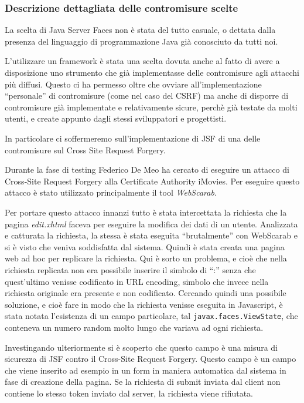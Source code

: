 \documentclass{article}
\begin{document}
\subsubsection{Descrizione dettagliata delle contromisure scelte}
La scelta di Java Server Faces non è stata del tutto casuale, o dettata dalla presenza del linguaggio di programmazione Java già conosciuto da tutti noi.

L'utilizzare un framework è stata una scelta dovuta anche al fatto di avere a disposizione uno strumento che già implementasse delle contromisure agli attacchi più diffusi. Questo ci ha permesso oltre che ovviare all'implementazione ``personale'' di contromisure (come nel caso del CSRF) ma anche di disporre di contromisure già implementate e relativamente sicure, perchè già testate da molti utenti, e create appunto dagli stessi sviluppatori e progettisti.

In particolare ci soffermeremo sull'implementazione di JSF di una delle contromisure sul Cross Site Request Forgery. 

Durante la fase di testing Federico De Meo ha cercato di eseguire un attacco di Cross-Site Request Forgery alla Certificate Authority iMovies. Per eseguire questo attacco è stato utilizzato principalmente il tool \emph{WebScarab}. 

Per portare questo attacco innanzi tutto è stata intercettata la richiesta che la pagina \emph{edit.xhtml} faceva per eseguire la modifica dei dati di un utente. Analizzata e catturata la richiesta, la stessa è stata eseguita ``brutalmente'' con WebScarab e si è visto che veniva soddisfatta dal sistema.
Quindi è stata creata una pagina web ad hoc per replicare la richiesta. Qui è sorto un problema, e cioè che nella richiesta replicata non era possibile inserire il simbolo di ``:'' senza che quest'ultimo venisse codificato in URL encoding, simbolo che invece nella richiesta originale era presente e non codificato.
Cercando quindi una possibile soluzione, e cioè fare in modo che la richiesta venisse eseguita in Javascript, è stata notata l'esistenza di un campo particolare, tal {\tt javax.faces.ViewState}, che conteneva un numero random molto lungo che variava ad ogni richiesta. 

Investingando ulteriormente si è scoperto che questo campo è una misura di sicurezza di JSF contro il Cross-Site Request Forgery.
Questo campo è un campo che viene inserito ad esempio in un form in maniera automatica dal sistema in fase di creazione della pagina. Se la richiesta di submit inviata dal client non contiene lo stesso token inviato dal server, la richiesta viene rifiutata.
\end{document}
